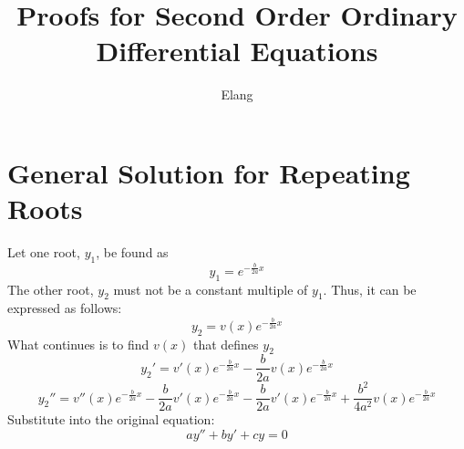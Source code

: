 \documentclass{article}
\author{Elang}
\title{Proofs for Second Order Ordinary Differential Equations}
\begin{document}
\maketitle

\section{General Solution for Repeating Roots}
Let one root, $y_1$, be found as
\begin{equation}
    y_1 = e^{-\frac{b}{2a}x}
\end{equation}
The other root, $y_2$ must not be a constant multiple of $y_1$. Thus, it can be expressed as follows: 
\begin{equation}
    y_2 = v(x)e^{-\frac{b}{2a}x}
\end{equation}
What continues is to find $v(x)$ that defines $y_2$
\begin{equation}
    y_2' = v'(x)e^{-\frac{b}{2a}x}
	   -\frac{b}{2a} v(x)e^{-\frac{b}{2a}x}
\end{equation}
\begin{equation}
    y_2'' =
        v''(x)e^{-\frac{b}{2a}x}
        -\frac{b}{2a}v'(x)e^{-\frac{b}{2a}x}
        -\frac{b}{2a}v'(x)e^{-\frac{b}{2a}x}
        +\frac{b^2}{4a^2}v(x)e^{-\frac{b}{2a}x}
\end{equation}
Substitute into the original equation: 
$$
ay'' + by' + cy = 0
$$
\end{document}
